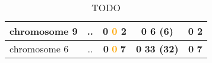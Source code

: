 \begin{table}[H]
\begin{tabular}{||l|c|c|c|c||}
\hline
chromosome 9&..&\textcolor{vert}{\textbf{0}} \textcolor{orange}{\textbf{0}} \textcolor{rose}{\textbf{2}} &\textcolor{vert}{\textbf{0}} \textcolor{rose}{\textbf{6 (6)}} &\textcolor{vert}{\textbf{0}} \textcolor{rose}{\textbf{2}} \\
\hline
chromosome 6&..&\textcolor{vert}{\textbf{0}} \textcolor{orange}{\textbf{0}} \textcolor{rose}{\textbf{7}} &\textcolor{vert}{\textbf{0}} \textcolor{rose}{\textbf{33 (32)}} &\textcolor{vert}{\textbf{0}} \textcolor{rose}{\textbf{7}} \\
\hline
\hline
		\end{tabular}
	\caption{TODO}
	\label{tab:TODO}
\end{table}